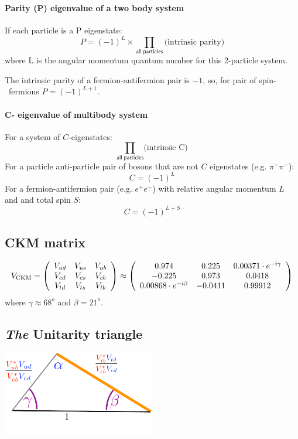 \paragraph{Parity (P) eigenvalue of a two body system}
If each particle is a P eigenstate:
\[
P = (-1)^{L} \times \prod\limits_{\mathsf{all\;particles}} \mbox{(intrinsic parity)}
\]
where L is the angular momentum quantum number for this 2-particle system.

The intrinsic parity of a fermion-antifermion pair is $-1$, so, for
pair of spin-\half\ fermions $ P =(-1)^{L+1}$.

\paragraph{C- eigenvalue of multibody system}
For a system of $C$-eigenstates:
\[
\prod\limits_{\mathsf{all\;particles}}
\mbox{(intrinsic C)}
\]
For a particle anti-particle pair of bosons that are not $C$
eigenstates (e.g. $\pi^+\pi^-$):
\[
C = (-1)^L
\]
For a fermion-antifermion pair (e.g. $e^+ e^-$) with relative angular
momentum $L$ and and total spin $S$:
\[
C = (-1)^{L+S}
\]


\subsection*{CKM matrix}

\begin{equation}
\label{eq:th.b.ckmlabel}
  V_{\mathrm{CKM}}= \left( \begin{array}{ccc}  V_{ud}  &  V_{us}  &  V_{ub}  \\ 
                        V_{cd}  &  V_{cs}  &  V_{cb}  \\ 
                        V_{td}  &  V_{ts}  &  V_{tb}  \end{array} \right)
\approx
                  \left( \begin{array}{ccc}  0.974  &  0.225  &  0.00371\cdot e^{-i \gamma}  \\ 
                        -0.225  &  0.973 & 0.0418  \\ 
                        0.00868\cdot e^{-i \beta}  & -0.0411  & 0.99912  \end{array} \right)
\end{equation}
where $\gamma \approx 68^o$ and $\beta = 21^o$.

\subsection*{\emph{The} Unitarity triangle}
\includegraphics[width=0.5\textwidth]{fig/UT}

